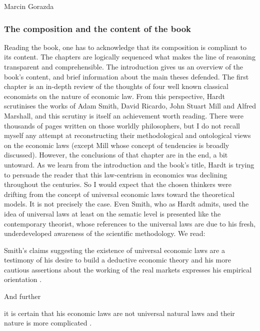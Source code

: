 \begin{recengenv}{Marcin Gorazda}
\subsubsection{The composition and the content of the book}
Reading the book, one has to acknowledge that its composition is compliant to its content. The chapters are logically
sequenced what makes the line of reasoning transparent and comprehensible. The introduction gives us an overview of the
book’s content, and brief information about the main theses defended. The first chapter is an in-depth review of the
thoughts of four well known classical economists on the nature of economic law. From this perspective, Hardt
scrutinises the works of Adam Smith, David Ricardo, John Stuart Mill and Alfred Marshall, and this scrutiny is itself
an achievement worth reading. There were thousands of pages written on those worldly philosophers, but I do not recall
myself any attempt at reconstructing their methodological and ontological views on the economic laws (except Mill whose
concept of tendencies is broadly discussed). However, the conclusions of that chapter are in the end, a bit untoward.
As we learn from the introduction and the book’s title, Hardt is trying to persuade the reader that this law-centrism
in economics was declining throughout the centuries. So I would expect that the chosen thinkers were drifting from the
concept of universal economic laws toward the theoretical models. It is not precisely the case. Even Smith, who as
Hardt admits, used the idea of universal laws at least on the sematic level is presented like the contemporary
theorist, whose references to the universal laws are due to his fresh, underdeveloped awareness of the scientific
methodology.  We read:


\begin{myquoterev}
	[\mydots] Smith’s claims suggesting the existence of universal economic laws are a testimony of his desire to build a
deductive economic theory and his more cautious assertions about the working of the real markets expresses his
empirical orientation
\parencite[p.30]{hardt_economics_2017}.
\end{myquoterev}
And further

\begin{myquoterev}
[\mydots] it is certain that his economic laws are not universal natural laws and their nature is more complicated
\parencite[p.31]{hardt_economics_2017}.
\end{myquoterev}


\end{recengenv}
